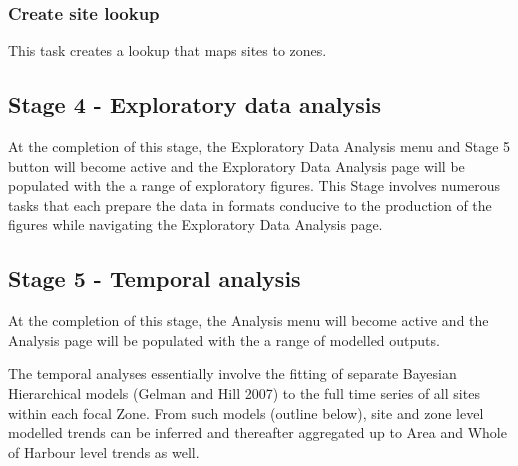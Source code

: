 \documentclass[
  8pt,
  a4paper]{article}
\begin{document}
\subsubsection{Create site lookup}\label{create-site-lookup}

This task creates a lookup that maps sites to zones.

\subsection{Stage 4 - Exploratory data
analysis}\label{stage-4---exploratory-data-analysis}

At the completion of this stage, the Exploratory Data Analysis menu and
Stage 5 button will become active and the Exploratory Data Analysis page
will be populated with the a range of exploratory figures. This Stage
involves numerous tasks that each prepare the data in formats conducive
to the production of the figures while navigating the Exploratory Data
Analysis page.

\subsection{Stage 5 - Temporal
analysis}\label{stage-5---temporal-analysis}

At the completion of this stage, the Analysis menu will become active
and the Analysis page will be populated with the a range of modelled
outputs.

The temporal analyses essentially involve the fitting of separate
Bayesian Hierarchical models (Gelman and Hill 2007) to the full time
series of all sites within each focal Zone. From such models (outline
below), site and zone level modelled trends can be inferred and
thereafter aggregated up to Area and Whole of Harbour level trends as
well.
\end{document}
